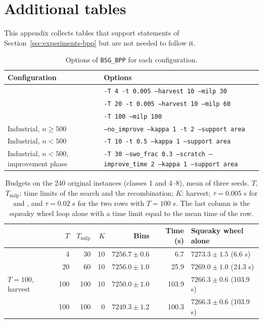 \section{Additional tables}
\label{app:tables}

This appendix collects tables that support statements of Section~\ref{sec:experiments-bpp} but are not needed to follow it.

\begin{table}[t]
\centering
\small
\caption{Options of \texttt{BSG\_BPP} for each configuration.}
\label{tab:e-commands}
\begin{tabular}{@{}lp{9.5cm}@{}}
\toprule
Configuration & Options\\
\midrule
\cfgfast{} & \texttt{-T 4 -t 0.005 --harvest 10 --milp 30}\\
\cfgbal{} & \texttt{-T 20 -t 0.005 --harvest 10 --milp 60}\\
\cfgqual{} & \texttt{-T 100 --milp 100}\\
Industrial, $n\ge 500$ & \texttt{--no\_improve --kappa 1 -t 2 --support area}\\
Industrial, $n<500$ & \texttt{-T 10 -t 0.5 --kappa 1 --support area}\\
Industrial, $n<500$, improvement phase & \texttt{-T 30 --swo\_frac 0.3 --scratch --improve\_time 2 --kappa 1 --support area}\\
\bottomrule
\end{tabular}
\end{table}

\begin{table}[t]
\centering
\small\setlength{\tabcolsep}{3pt}
\caption{Budgets on the 240 original instances (classes 1 and 4--8), mean of three seeds. $T$, $T_{\mathrm{milp}}$: time limits of the search and
the recombination; $K$: harvest; $\tau=0.005$ s for \cfgfast{} and \cfgbal{}, and $\tau=0.02$ s for the two rows with $T=100$ s. The last column is the squeaky wheel
loop alone with a time limit equal to the mean time of the row.}
\label{tab:e-budget}
\begin{tabular}{@{}lrrrrrl@{}}
\toprule
 & $T$ & $T_{\mathrm{milp}}$ & $K$ & Bins & Time (s) & Squeaky wheel alone\\
\midrule
\cfgfast{} & 4 & 30 & 10 & $7256.7\pm 0.6$ & 6.7 & $7273.3\pm 1.5$ (6.6 s)\\
\cfgbal{} & 20 & 60 & 10 & $7256.0\pm 1.0$ & 25.9 & $7269.0\pm 1.0$ (24.3 s)\\
$T=100$, harvest & 100 & 100 & 10 & $7250.0\pm 1.0$ & 103.9 & $7266.3\pm 0.6$ (103.9 s)\\
\cfgqual{} & 100 & 100 & 0 & $7249.3\pm 1.2$ & 100.3 & $7266.3\pm 0.6$ (103.9 s)\\
\bottomrule
\end{tabular}
\end{table}

